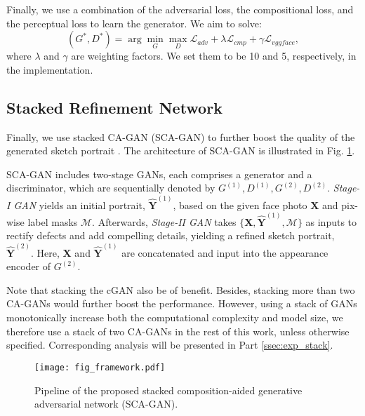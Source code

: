 \documentclass[journal]{IEEEtran}
\begin{document}
Finally, we use a combination of the adversarial loss, the compositional loss, and the perceptual loss to learn the generator. We aim to solve:
\begin{equation}
\label{eq:objective}
(G^*,D^*) = \arg \min_G \max_D { \mathcal{L}_{adv} + \lambda \mathcal{L}_{cmp} + \gamma \mathcal{L}_{vggface}},
\end{equation}
where $\lambda$ and $\gamma$ are weighting factors. We set them to be 10 and 5, respectively, in the implementation.


\subsection{Stacked Refinement Network}
\label{sec:stackgan}

Finally, we use stacked CA-GAN (SCA-GAN) to further boost the quality of the generated sketch portrait \cite{Zhang2017StackGAN}. The architecture of SCA-GAN is illustrated in Fig. \ref{fig:stackcagan}. 

SCA-GAN includes two-stage GANs, each comprises a generator and a discriminator, which are sequentially denoted by $G^{(1)}, D^{(1)}, G^{(2)}, D^{(2)}$. \textit{Stage-I GAN} yields an initial portrait, $\widehat{\mathbf{Y}}^{(1)}$, based on the given face photo $\mathbf{X}$ and pix-wise label masks $\mathcal{M}$. Afterwards, \textit{Stage-II GAN} takes $\{ \mathbf{X}, \widehat{\mathbf{Y}}^{(1)}, \mathcal{M} \}$ as inputs to rectify defects and add compelling details, yielding a refined sketch portrait, $\widehat{\mathbf{Y}}^{(2)}$. Here, $\mathbf{X}$ and $\widehat{\mathbf{Y}}^{(1)}$ are concatenated and input into the appearance encoder of $G^{(2)}$. 

Note that stacking the cGAN also be of benefit. Besides, stacking more than two CA-GANs would further boost the performance. However, using a stack of GANs monotonically increase both the computational complexity and model size, we therefore use a stack of two CA-GANs in the rest of this work, unless otherwise specified. Corresponding analysis will be presented in Part \ref{ssec:exp_stack}. 


\begin{figure}
\begin{center}
\texttt{[image: fig\_framework.pdf]}
\end{center}
   \vspace{-0.4cm}
   \caption{Pipeline of the proposed stacked composition-aided generative adversarial network (SCA-GAN).}
\label{fig:stackcagan}
   \vspace{-0.4cm}
\end{figure}
\end{document}
